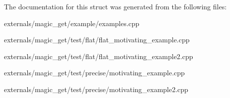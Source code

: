 The documentation for this struct was generated from the following files\+:\begin{DoxyCompactItemize}
\item 
externals/magic\+\_\+get/example/examples.\+cpp\item 
externals/magic\+\_\+get/test/flat/flat\+\_\+motivating\+\_\+example.\+cpp\item 
externals/magic\+\_\+get/test/flat/flat\+\_\+motivating\+\_\+example2.\+cpp\item 
externals/magic\+\_\+get/test/precise/motivating\+\_\+example.\+cpp\item 
externals/magic\+\_\+get/test/precise/motivating\+\_\+example2.\+cpp\end{DoxyCompactItemize}
